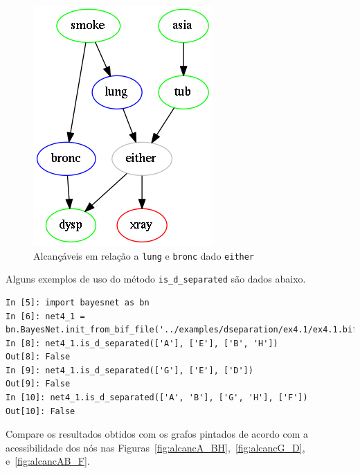 \documentclass[paper=a4, fontsize=11pt]{scrartcl} %
\numberwithin{equation}{subsection}
\numberwithin{figure}{subsection}
\numberwithin{table}{subsection}
\numberwithin{definition}{subsection}
\numberwithin{theorem}{subsection}
\numberwithin{property}{subsection}
\numberwithin{proposition}{subsection}
\numberwithin{equation}{section}
\numberwithin{figure}{section}
\numberwithin{table}{section}
\numberwithin{definition}{section}
\numberwithin{theorem}{section}
\numberwithin{property}{section}
\numberwithin{proposition}{section}
\begin{document}
\begin{figure}[hbtp]
\centering
\includegraphics[scale=0.5]{images/reach_lung_bronc_giv_either.png}
\caption{Alcançáveis em relação a \texttt{lung} e \texttt{bronc} dado \texttt{either}}
\label{fig:alcanc}
\end{figure}

Alguns exemplos de uso do método \verb|is_d_separated| são dados abaixo.

\begin{verbatim}
In [5]: import bayesnet as bn
In [6]: net4_1 = bn.BayesNet.init_from_bif_file('../examples/dseparation/ex4.1/ex4.1.bif')
In [8]: net4_1.is_d_separated(['A'], ['E'], ['B', 'H'])
Out[8]: False
In [9]: net4_1.is_d_separated(['G'], ['E'], ['D'])
Out[9]: False
In [10]: net4_1.is_d_separated(['A', 'B'], ['G', 'H'], ['F'])
Out[10]: False
\end{verbatim}

Compare os resultados obtidos com os grafos pintados de acordo com a acessibilidade dos nós nas Figuras~\ref{fig:alcancA_BH},~\ref{fig:alcancG_D}, e~\ref{fig:alcancAB_F}.
\end{document}
